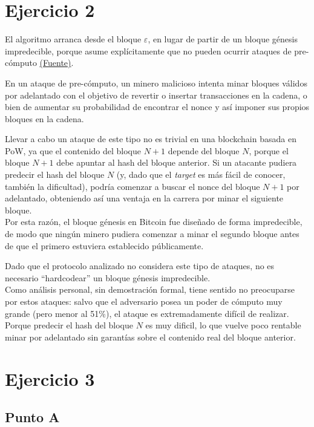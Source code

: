 \documentclass[12pt]{article}
\begin{document}
\section*{Ejercicio 2}

El algoritmo arranca desde el bloque $\varepsilon$, en lugar de partir de un bloque génesis impredecible, porque asume explícitamente que no pueden ocurrir ataques de pre-cómputo \href{https://dl.acm.org/doi/10.1145/3653445#fn13}{(Fuente)}.

En un ataque de pre-cómputo, un minero malicioso intenta minar bloques válidos por adelantado con el objetivo de revertir o insertar transacciones en la cadena, o bien de aumentar su probabilidad de encontrar el nonce y así imponer sus propios bloques en la cadena. 

Llevar a cabo un ataque de este tipo no es trivial en una blockchain basada en PoW, ya que el contenido del bloque $N+1$ depende del bloque $N$, porque el bloque $N + 1$ debe apuntar al hash del bloque anterior. Si un atacante pudiera predecir el hash del bloque $N$ (y, dado que el \emph{target} es más fácil de conocer, también la dificultad), podría comenzar a buscar el nonce del bloque $N+1$ por adelantado, obteniendo así una ventaja en la carrera por minar el siguiente bloque. \\

Por esta razón, el bloque génesis en Bitcoin fue diseñado de forma impredecible, de modo que ningún minero pudiera comenzar a minar el segundo bloque antes de que el primero estuviera establecido públicamente.

Dado que el protocolo analizado no considera este tipo de ataques, no es necesario ``hardcodear'' un bloque génesis impredecible. \\

Como análisis personal, sin demostración formal, tiene sentido no preocuparse por estos ataques: salvo que el adversario posea un poder de cómputo muy grande (pero menor al 51\%), el ataque es extremadamente difícil de realizar. Porque predecir el hash del bloque $N$ es muy dificil, lo que vuelve poco rentable minar por adelantado sin garantías sobre el contenido real del bloque anterior.

\section*{Ejercicio 3}

\subsection*{Punto A}
\end{document}
